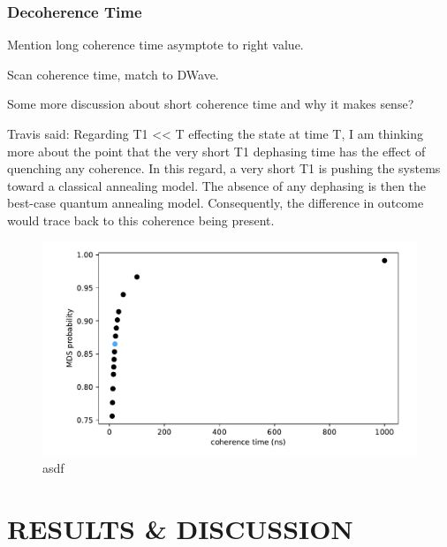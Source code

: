 \documentclass[prd,twocolumn,tightenlines,preprintnumbers,showpacs,superscriptaddress,notitlepage,nofootinbib,eqsecnum,floatfix,longbibliography]{revtex4}
\begin{document}
\subsubsection{Decoherence Time}
\label{sec:methods:deco}

Mention long coherence time asymptote to right value.

Scan coherence time, match to DWave.

Some more discussion about short coherence time and why it makes sense?

Travis said: Regarding T1 << T effecting the state at time T, I am thinking more about the point that the very short T1 dephasing time has the effect of quenching any coherence.
In this regard, a very short T1 is pushing the systems toward a classical annealing model.
The absence of any dephasing is then the best-case quantum annealing model.
Consequently, the difference in outcome would trace back to this coherence being present.

\begin{figure}
    \centering
    \includegraphics[width=\columnwidth]{./figures/coherence.pdf}
    \caption{asdf}
    \label{fig:prob_mi}
\end{figure}


\section{RESULTS \& DISCUSSION}
\label{sec:results}
\end{document}
